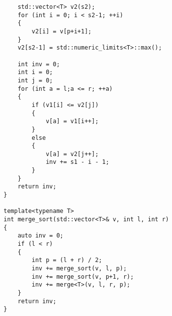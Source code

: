 \documentclass[11pt, letterpaper]{article}
\begin{document}
\begin{enumerate}[label=\alph*)]
\begin{lstlisting}
            std::vector<T> v2(s2);
            for (int i = 0; i < s2-1; ++i)
            {
                v2[i] = v[p+i+1];
            }
            v2[s2-1] = std::numeric_limits<T>::max();
            
            int inv = 0;
            int i = 0;
            int j = 0;
            for (int a = l;a <= r; ++a)
            {
                if (v1[i] <= v2[j])
                {
                    v[a] = v1[i++];
                }
                else
                {
                    v[a] = v2[j++];
                    inv += s1 - i - 1;
                }
            }
            return inv;
        }

        template<typename T>
        int merge_sort(std::vector<T>& v, int l, int r)
        {
            auto inv = 0;
            if (l < r)
            {
                int p = (l + r) / 2;
                inv += merge_sort(v, l, p);
                inv += merge_sort(v, p+1, r);
                inv += merge<T>(v, l, r, p);
            }
            return inv;
        }
        \end{lstlisting}
\end{enumerate} 
\end{document}
